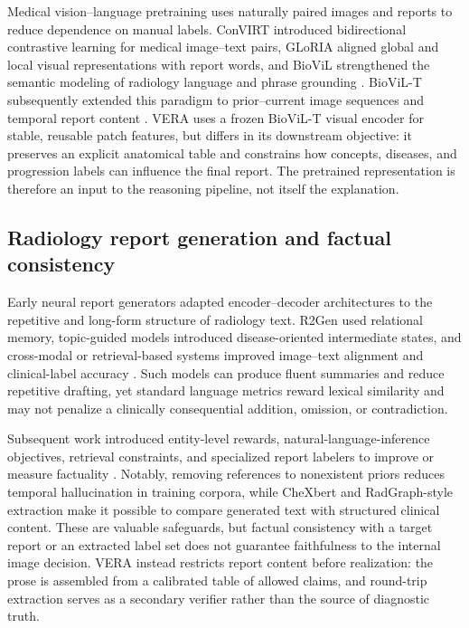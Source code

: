 \documentclass[preprint,12pt]{elsarticle}
\begin{document}
Medical vision--language pretraining uses naturally paired images and reports to
reduce dependence on manual labels. ConVIRT introduced bidirectional contrastive
learning for medical image--text pairs, GLoRIA aligned global and local visual
representations with report words, and BioViL strengthened the semantic modeling
of radiology language and phrase grounding
\cite{zhang2022convirt,huang2021gloria,boecking2022biovil}. BioViL-T subsequently
extended this paradigm to prior--current image sequences and temporal report
content \cite{bannur2023biovilt,karwande2022chexrelnet}. VERA uses a frozen
BioViL-T visual encoder for stable, reusable patch features, but differs in its
downstream objective: it preserves an explicit anatomical table and constrains
how concepts, diseases, and progression labels can influence the final report.
The pretrained representation is therefore an input to the reasoning pipeline,
not itself the explanation.

\subsection{Radiology report generation and factual consistency}

Early neural report generators adapted encoder--decoder architectures to the
repetitive and long-form structure of radiology text. R2Gen used relational
memory, topic-guided models introduced disease-oriented intermediate states, and
cross-modal or retrieval-based systems improved image--text alignment and
clinical-label accuracy \cite{chen2020r2gen,nguyen2021accurate,endo2021repair}.
Such models can produce fluent summaries and reduce repetitive drafting, yet
standard language metrics reward lexical similarity and may not penalize a
clinically consequential addition, omission, or contradiction.

Subsequent work introduced entity-level rewards, natural-language-inference
objectives, retrieval constraints, and specialized report labelers to improve or
measure factuality \cite{miura2021factual,ramesh2022priors,smit2020chexbert,khanna2023radgraph2}.
Notably, removing references to nonexistent priors reduces temporal hallucination
in training corpora, while CheXbert and RadGraph-style extraction make it
possible to compare generated text with structured clinical content. These are
valuable safeguards, but factual consistency with a target report or an
extracted label set does not guarantee faithfulness to the internal image
decision. VERA instead restricts report content before realization: the prose is
assembled from a calibrated table of allowed claims, and round-trip extraction
serves as a secondary verifier rather than the source of diagnostic truth.
\end{document}
